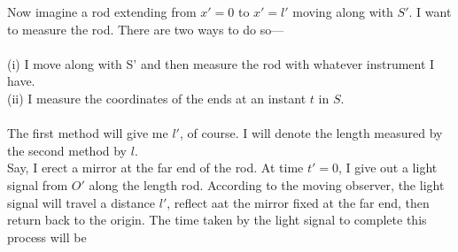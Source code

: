 \documentclass[12pt]{article}
\begin{document}
\begin{center}
\end{center}

Now imagine a rod extending from $x'=0$ to $x' = l'$ moving along with $S'$. I want to measure the rod. 
There are two ways to do so---
\\\\
(i) I move along with S' and then measure the rod with whatever instrument I have. \\
(ii) I measure the coordinates of the ends at an instant $t$ in $S$. 
\\\\
The first method will give me $l'$, of course. I will denote the length measured by the second method 
by $l$. \\ 
Say, I erect a mirror at the far end of the rod. At time $t'=0$, I give out a light signal from $O'$ along the length rod. 
According to the moving observer, the light signal will travel a distance $l'$, reflect aat the mirror fixed at the far end, then return back to the origin. The time taken by the light signal to complete this process will be 
\end{document}
